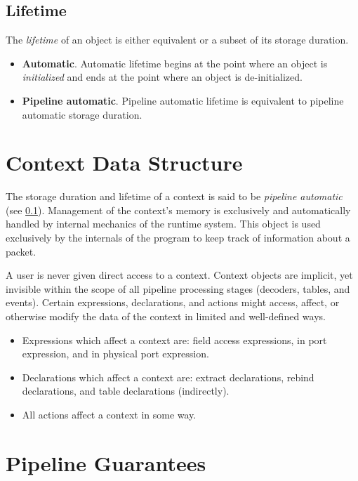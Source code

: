 \subsection{Lifetime} \label{lifetime_guide}

The \textit{lifetime} of an object is either equivalent or a subset of its storage duration.

\begin{itemize}
\item \textbf{Automatic}. Automatic lifetime begins at the point where an object is \textit{initialized} and ends at the point where an object is de-initialized.
\item \textbf{Pipeline automatic}. Pipeline automatic lifetime is equivalent to pipeline automatic storage duration.
\end{itemize}

\section{Context Data Structure} \label{context_guide}

The storage duration and lifetime of a context is said to be \textit{pipeline automatic} (see \ref{lifetime_guide}). Management of the context's memory is exclusively and automatically handled by internal mechanics of the runtime system. This object is used exclusively by the internals of the program to keep track of information about a packet. 

A user is never given direct access to a context. Context objects are implicit, yet invisible within the scope of all pipeline processing stages (decoders, tables, and events). Certain expressions, declarations, and actions might access, affect, or otherwise modify the data of the context in limited and well-defined ways. 
\begin{itemize}
\item Expressions which affect a context are: field access expressions, in port expression, and in physical port expression.

\item Declarations which affect a context are: extract declarations, rebind declarations, and table declarations (indirectly).

\item All actions affect a context in some way.
\end{itemize}

\section{Pipeline Guarantees} \label{pipeline_checking_guide}

